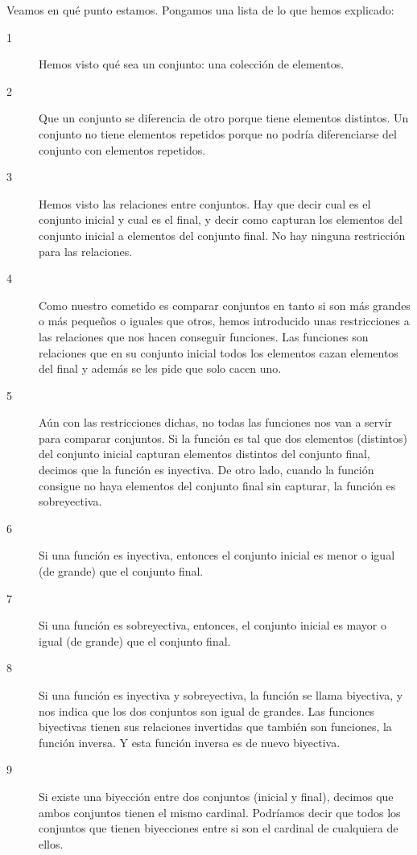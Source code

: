 \documentclass{amsart}
\theoremstyle{definition}
\theoremstyle{remark}
\numberwithin{equation}{section}
\begin{document}
Veamos en qué punto estamos. Pongamos una lista de lo que hemos explicado:
\begin{description}
  \item[1] Hemos visto qué sea un conjunto: una colección de elementos.
  \item[2] Que un conjunto se diferencia de otro porque tiene elementos 
  distintos. Un conjunto no tiene elementos repetidos porque no podría 
  diferenciarse del conjunto con elementos repetidos.
  \item[3] Hemos visto las relaciones entre conjuntos. Hay que decir cual 
  es el conjunto inicial y cual es el final, y decir como capturan los 
  elementos del conjunto inicial a elementos del conjunto final. No hay 
  ninguna restricción para las relaciones.
  \item[4] Como nuestro cometido es comparar conjuntos en tanto si son más 
  grandes o más pequeños o iguales que otros, hemos introducido unas 
  restricciones a las relaciones que nos hacen conseguir funciones. Las 
  funciones son relaciones que en su conjunto inicial todos los elementos 
  cazan elementos del final y además se les pide que solo cacen uno.
  \item[5] Aún con las restricciones dichas, no todas las funciones nos van 
  a servir para comparar conjuntos. Si la función es tal que dos elementos 
  (distintos) del conjunto inicial capturan elementos distintos del 
  conjunto final, decimos que la función es inyectiva. De otro lado, cuando 
  la función consigue no haya elementos del conjunto final sin capturar, la 
  función es sobreyectiva.
  \item[6] Si una función es inyectiva, entonces el conjunto inicial es 
  menor o igual (de grande) que el conjunto final.
  \item[7] Si una función es sobreyectiva, entonces, el conjunto inicial es 
  mayor o igual (de grande) que el conjunto final.
  \item[8] Si una función es inyectiva y sobreyectiva, la función se llama 
  biyectiva, y nos indica que los dos conjuntos son igual de grandes. Las 
  funciones biyectivas tienen sus relaciones invertidas que también son 
  funciones, la función inversa. Y esta función inversa es de nuevo 
  biyectiva.
  \item[9] Si existe una biyección entre dos conjuntos (inicial y final), 
  decimos que ambos conjuntos tienen el mismo cardinal. Podríamos decir que 
  todos los conjuntos que tienen biyecciones entre si son el cardinal de 
  cualquiera de ellos.

\end{description}
\end{document}
